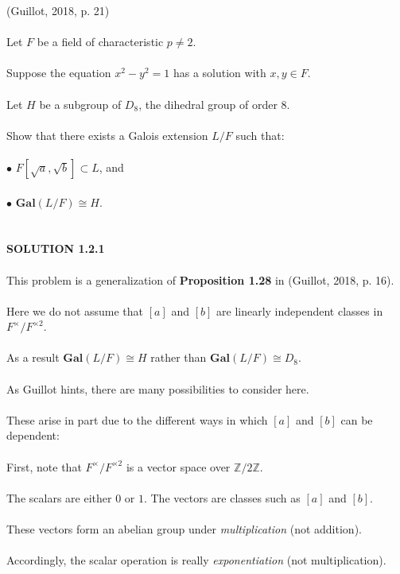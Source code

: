 \documentclass{article}
\begin{document}
 \indent (Guillot, 2018, p. 21) \\\\
\indent Let $F$ be a field of characteristic $p \neq 2$. \\\\
\indent Suppose the equation $x^2 - y^2 = 1$ has a solution with $x, y \in F$. \\\\
\indent Let $H$ be a subgroup of $D_8$, the dihedral group of order 8. \\\\
\indent Show that there exists a Galois extension $L/F$ such that: \\\\
\indent $\bullet$ \indent $F[\sqrt{a}, \sqrt{b}] \subset L$, and \\\\
\indent $\bullet$ \indent $\textbf{Gal}(L/F) \cong H$. \\\\
\\
\textbf{SOLUTION 1.2.1} \\\\
This problem is a generalization of \textbf{Proposition 1.28} in (Guillot, 2018, p. 16). \\\\
Here we do not assume that $[a]$ and $[b]$ are linearly independent classes in $F^\times/F^{\times2}$. \\\\
As a result $\textbf{Gal}(L/F) \cong H$ rather than $\textbf{Gal}(L/F) \cong D_8$. \\\\
As Guillot hints, there are many possibilities to consider here. \\\\
These arise in part due to the different ways in which $[a]$ and $[b]$ can be dependent: \\\\
\indent First, note that $F^\times/F^{\times2}$ is a vector space over $\mathbb{Z}/2\mathbb{Z}$. \\\\
\indent The scalars are either $0$ or $1$. The vectors are classes such as $[a]$ and $[b]$. \\\\
\indent These vectors form an abelian group under \emph{multiplication} (not addition). \\\\
\indent Accordingly, the scalar operation is really \emph{exponentiation} (not multiplication). \\\\
\end{document}
